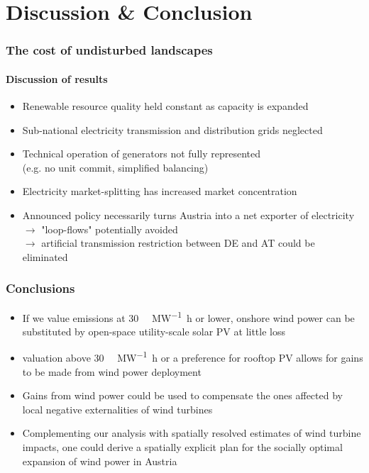 \documentclass[aspectratio=1610, xcolor=dvipsnames,handout]{beamer} %
\begin{document}
\section{Discussion \& Conclusion}
\begin{frame}
\frametitle{The cost of undisturbed landscapes}
\framesubtitle{Discussion of results}
\begin{itemize}
\item Renewable resource quality held constant as capacity is expanded
\item Sub-national electricity transmission and distribution grids neglected
\item Technical operation of generators not fully represented \\(e.g. no unit commit, simplified balancing)
\item Electricity market-splitting has increased market concentration
\item Announced policy necessarily turns Austria into a net exporter of electricity\\
$\rightarrow$ "loop-flows" potentially avoided \\
$\rightarrow$ artificial transmission restriction between DE and AT could be eliminated
\end{itemize}
\end{frame}


\begin{frame}
\frametitle{Conclusions}
\begin{itemize}
\item If we value  emissions at 30 \SI{}{\text{\euro}\per\mega\watt\hour} or lower, onshore wind power can be substituted by open-space utility-scale solar PV at little loss

\item {} valuation above 30 \SI{}{\text{\euro}\per\mega\watt\hour} or a preference for rooftop PV allows for gains to be made from wind power deployment

\item Gains from wind power could be used to compensate the ones affected by local negative externalities of wind turbines

\item Complementing our analysis with spatially resolved estimates of wind turbine impacts, one could derive a spatially explicit plan for the socially optimal expansion of wind power in Austria
\end{itemize}
\end{frame}
\end{document}
